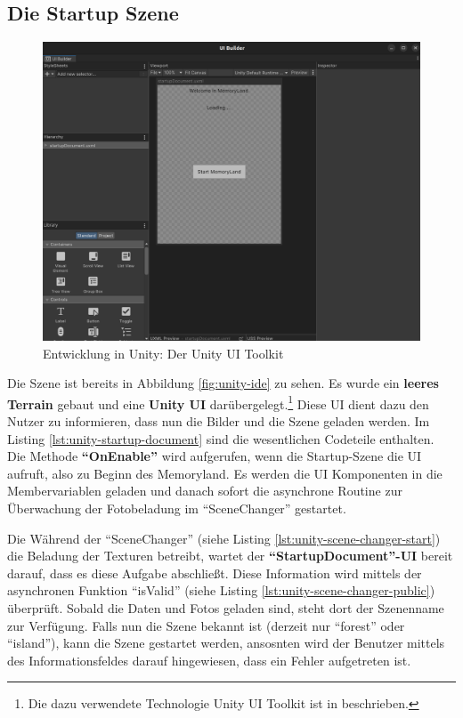 \subsection{Die Startup Szene}
\label{subsec:unity-startup-scene}


\begin{figure} [h t]
    \centering
    \includegraphics[scale=0.12]{pics/unity-ui-builder.png}
    \caption{Entwicklung in Unity: Der Unity UI Toolkit}
    \label{fig:unity-ui-builder}
\end{figure}


Die Szene ist bereits in Abbildung \ref{fig:unity-ide} zu sehen. Es wurde ein \textbf{leeres Terrain} gebaut und eine \textbf{Unity UI} darübergelegt.\footnote{Die dazu verwendete Technologie Unity UI Toolkit ist in \cite{UnityDocsUIToolkit} beschrieben.} Diese UI dient dazu den Nutzer zu informieren, dass nun die Bilder und die Szene geladen werden. Im Listing \ref{lst:unity-startup-document} sind die wesentlichen Codeteile enthalten. Die Methode \textbf{``OnEnable''} wird aufgerufen, wenn die Startup-Szene die UI aufruft, also zu Beginn des Memoryland. Es werden die UI Komponenten in die Membervariablen geladen und danach sofort die asynchrone Routine zur Überwachung der Fotobeladung im ``SceneChanger'' gestartet. 


Die Während der ``SceneChanger'' (siehe Listing \ref{lst:unity-scene-changer-start}) die Beladung der Texturen betreibt, wartet der \textbf{``StartupDocument''-UI} bereit darauf, dass es diese Aufgabe abschlie\ss{}t. Diese Information wird mittels der asynchronen Funktion ``isValid'' (siehe Listing \ref{lst:unity-scene-changer-public}) überprüft. Sobald die Daten und Fotos geladen sind, steht dort der Szenenname zur Verfügung. Falls nun die Szene bekannt ist (derzeit nur ``forest'' oder ``island''), kann die Szene gestartet werden, ansosnten wird der Benutzer mittels des Informationsfeldes darauf hingewiesen, dass ein Fehler aufgetreten ist.



